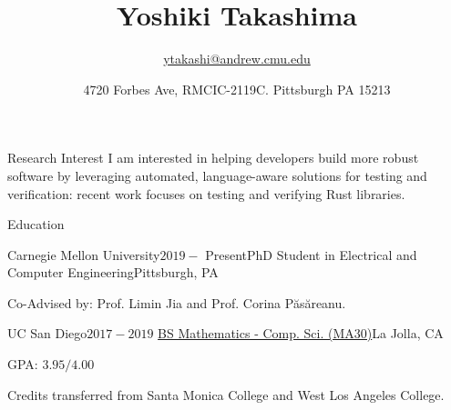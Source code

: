 \documentclass{resume} %
\title{\bf Yoshiki Takashima}
\author{\href{ytakashi@andrew.cmu.edu}{ytakashi@andrew.cmu.edu}}
\date{4720 Forbes Ave, RMCIC-2119C. Pittsburgh PA 15213}
\begin{document}
\maketitle

\begin{rSection}{Research Interest}
  I am interested in helping developers build more robust software by
  leveraging automated, language-aware solutions for testing and
  verification: recent work focuses on testing and verifying Rust
  libraries.
\end{rSection}

\begin{rSection}{Education}
  \begin{rSubsection}{Carnegie Mellon University}{$2019 -$
      Present}{PhD Student in Electrical and Computer
      Engineering}{Pittsburgh, PA}
  \item Co-Advised by: Prof. Limin Jia and Prof. Corina P\u{a}s\u{a}reanu.
  \end{rSubsection}

  \begin{rSubsection}{UC San Diego}{$2017 -
      2019$}{
      \href{https://catalog.ucsd.edu/curric/MATH-ug.html}
      {BS Mathematics - Comp. Sci. (MA30)}}{La Jolla, CA}
  \item GPA: $3.95/4.00$
  \item Credits transferred from Santa Monica College and West Los
    Angeles College.
  \end{rSubsection}


\end{rSection}
\end{document}
